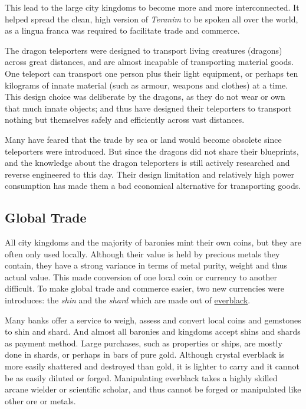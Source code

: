 This lead to the large city kingdoms to become more and more interconnected.
It helped spread the clean, high version of \emph{Teranim} to be spoken all
over the world, as a lingua franca was required to facilitate trade and
commerce.

The dragon teleporters were designed to transport living creatures (dragons)
across great distances, and are almost incapable of transporting material
goods. One teleport can transport one person plus their light equipment, or
perhaps ten kilograms of innate material (such as armour, weapons and
clothes) at a time. This design choice was deliberate by the dragons, as they
do not wear or own that much innate objects; and thus have designed their
teleporters to transport nothing but themselves safely and efficiently across
vast distances.

Many have feared that the trade by sea or land would become obsolete since
teleporters were introduced. But since the dragons did not share their
blueprints, and the knowledge about the dragon teleporters is still actively
researched and reverse engineered to this day. Their design limitation and
relatively high power consumption has made them a bad economical alternative
for transporting goods.

\subsection{Global Trade}
\label{sec:Trade}

All city kingdoms and the majority of baronies mint their own coins, but they
are often only used locally. Although their value is held by precious metals
they contain, they have a strong variance in terms of metal purity, weight and
thus actual value. This made conversion of one local coin or currency to
another difficult. To make global trade and commerce easier, two new
currencies were introduces: the \emph{shin} and the \emph{shard} which are
made out of \hyperref[sec:Everblack]{everblack}.

Many banks offer a service to weigh, assess and convert local coins and
gemstones to shin and shard. And almost all baronies and kingdoms accept shins
and shards as payment method. Large purchases, such as properties or ships, are
mostly done in shards, or perhaps in bars of pure gold. Although crystal
everblack is more easily shattered and destroyed than gold, it is lighter
to carry and it cannot be as easily diluted or forged. Manipulating everblack
takes a highly skilled arcane wielder or scientific scholar, and thus cannot
be forged or manipulated like other ore or metals.

